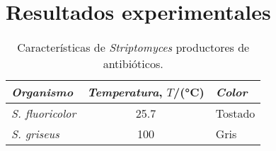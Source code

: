 \section{Resultados experimentales}
\label{apend:Experimentales}



\begin{table}
    \centering
    \caption{Características de \textit{Striptomyces} productores de antibióticos.}
	\label{Cuadro:Striptomyces}
	\begin{tabularx}{\linewidth}{XSl}
		\toprule
        \textit{Organismo} & {\textit{Temperatura}, $T$/(\si{\degreeCelsius})} & \textit{Color} \\
		\midrule
        \textit{S. fluoricolor} & 25.7 & Tostado \\
        \textit{S. griseus} & 100  & Gris \\
		\bottomrule
	\end{tabularx}
\end{table}